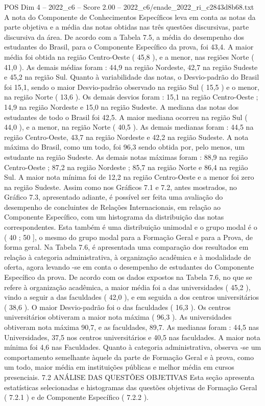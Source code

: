 \begin{textsample}{POS Dim 4 – 2022\_c6 – Score 2.00 – 2022\_c6/enade\_2022\_ri\_c2843d8b68.txt}
A nota do Componente de Conhecimentos Específicos leva em conta as notas da parte objetiva e a média das notas obtidas nas três questões discursivas, parte discursiva da área.
De acordo com a Tabela 7.5, a média do desempenho dos estudantes do Brasil, para o Componente Específico da prova, foi 43,4.
A maior média foi obtida na região Centro-Oeste ( 45,8 ), e a menor, nas regiões Norte ( 41,0 ).
As demais médias foram : 44,9 na região Nordeste, 42,7 na região Sudeste e 45,2 na região Sul.
Quanto à variabilidade das notas, o Desvio-padrão do Brasil foi 15,1, sendo o maior Desvio-padrão observado na região Sul ( 15,5 ) e o menor, na região Norte ( 13,6 ).
Os demais desvios foram : 15,1 na região Centro-Oeste ; 14,9 na região Nordeste e 15,0 na região Sudeste.
A mediana das notas dos estudantes de todo o Brasil foi 42,5.
A maior mediana ocorreu na região Sul ( 44,0 ), e a menor, na região Norte ( 40,5 ).
As demais medianas foram : 44,5 na região Centro-Oeste, 43,7 na região Nordeste e 42,2 na região Sudeste.
A nota máxima do Brasil, como um todo, foi 96,3 sendo obtida por, pelo menos, um estudante na região Sudeste.
As demais notas máximas foram : 88,9 na região Centro-Oeste ; 87,2 na região Nordeste ; 85,7 na região Norte e 86,4 na região Sul.
A maior nota mínima foi de 12,2 na região Centro-Oeste e a menor foi zero na região Sudeste.
Assim como nos Gráficos 7.1 e 7.2, antes mostrados, no Gráfico 7.3, apresentado adiante, é possível ser feita uma avaliação do desempenho de concluintes de Relações Internacionais, em relação ao Componente Específico, com um histograma da distribuição das notas correspondentes.
Esta também é uma distribuição unimodal e o grupo modal é o ( 40 ; 50 ], o mesmo do grupo modal para a Formação Geral e para a Prova, de forma geral.
Na Tabela 7.6, é apresentada uma comparação dos resultados em relação à categoria administrativa, à organização acadêmica e à modalidade de oferta, agora levando -se em conta o desempenho de estudantes do Componente Específico da prova.
De acordo com os dados expostos na Tabela 7.6, no que se refere à organização acadêmica, a maior média foi a das universidades ( 45,2 ), vindo a seguir a das faculdades ( 42,0 ), e em seguida a dos centros universitários ( 38,6 ).
O maior Desvio-padrão foi o das faculdades ( 16,3 ).
Os centros universitários obtiveram a maior nota máxima ( 96,3 ).
As universidades obtiveram nota máxima 90,7, e as faculdades, 89,7.
As medianas foram : 44,5 nas Universidades, 37,5 nos centros universitários e 40,5 nas faculdades.
A maior nota mínima foi 4,6 nas Faculdades.
Quanto à categoria administrativa, observa -se um comportamento semelhante àquele da parte de Formação Geral e à prova, como um todo, maior média em instituições públicas e melhor média em cursos presenciais. 7.2 ANÁLISE DAS QUESTÕES OBJETIVAS Esta seção apresenta estatísticas selecionadas e histogramas das questões objetivas de Formação Geral ( 7.2.1 ) e de Componente Específico ( 7.2.2 ).

\end{textsample}
